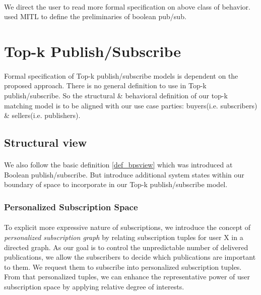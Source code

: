 \documentclass[a4paper,12pt,oneside]{book}
\theoremstyle{definition}
\theoremstyle{remark}
\begin{document}
\paragraph*{}
We direct the user to \cite{Pripuzic2010} read more formal specification on above class of behavior.  \cite{Pripuzic2010} used \ac{MITL} to define the preliminaries of boolean pub/sub. 

\section{Top-k Publish/Subscribe}
\paragraph*{}
Formal specification of Top-k publish/subscribe models is dependent on the proposed approach. There is no general definition to use in Top-k publish/subscribe. So the structural \& behavioral definition of our top-k matching model is to be aligned with our use case parties: buyers(i.e. subscribers) \& sellers(i.e. publishers). 

\subsection{Structural view}
\paragraph*{}
We also follow the basic definition \ref{def_bpsview} which was introduced at Boolean publish/subscribe. But introduce additional system states within our boundary of space to incorporate in our Top-k publish/subscribe model.

\subsubsection{Personalized Subscription Space}
\label{sec:persubspace}
\paragraph*{}
To explicit more expressive nature of subscriptions, we introduce the concept of \emph{personalized subscription graph} by relating subscription tuples for user X in a directed graph. As our goal is to control the unpredictable number of delivered publications, we allow the subscribers to decide which publications are important to them. We request them to subscribe into personalized subscription tuples. From that personalized tuples, we can enhance the representative power of user subscription space by applying relative degree of interests.
\end{document}
